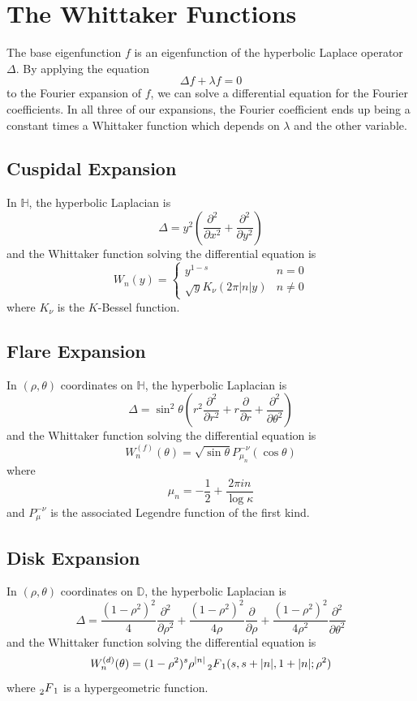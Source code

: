 \documentclass[]{article}
\begin{document}
\section*{The Whittaker Functions}

The base eigenfunction $f$ is an eigenfunction of the hyperbolic Laplace operator $\Delta$.
By applying the equation
$$
\Delta f + \lambda f = 0
$$
to the Fourier expansion of $f$, we can solve a differential equation for the Fourier coefficients.
In all three of our expansions, the Fourier coefficient ends up being a constant times a Whittaker function which depends on $\lambda$ and the other variable.

\subsection*{Cuspidal Expansion}

In $\mathbb{H}$, the hyperbolic Laplacian is
$$
\Delta = y^2\left( \frac{\partial^2}{\partial x^2} + \frac{\partial^2}{\partial y^2} \right)
$$
and the Whittaker function solving the differential equation is
$$
W_n(y) =
\begin{cases}
	y^{1 - s} & n = 0 \\
	\sqrt{y}K_\nu(2\pi|n|y) & n \neq 0
\end{cases}
$$
where $K_\nu$ is the $K$-Bessel function.

\subsection*{Flare Expansion}

In $(\rho, \theta)$ coordinates on $\mathbb{H}$, the hyperbolic Laplacian is
$$
\Delta = \sin^2\theta\left(r^2\frac{\partial^2}{\partial r^2} + r\frac{\partial}{\partial r} + \frac{\partial^2}{\partial\theta^2}\right)
$$
and the Whittaker function solving the differential equation is
$$
W_n^{(f)}(\theta) = \sqrt{\sin\theta}P^{-\nu}_{\mu_n}(\cos\theta)
$$
where
$$
\mu_n = -\frac{1}{2} + \frac{2\pi in}{\log \kappa}
$$
and $P_\mu^{-\nu}$ is the associated Legendre function of the first kind.

\subsection*{Disk Expansion}

In $(\rho, \theta)$ coordinates on $\mathbb{D}$, the hyperbolic Laplacian is
$$
\Delta = \frac{(1 - \rho^2)^2}{4}\frac{\partial^2}{\partial\rho^2} +
\frac{(1 - \rho^2)^2}{4\rho}\frac{\partial}{\partial\rho} +
\frac{(1 - \rho^2)^2}{4\rho^2}\frac{\partial^2}{\partial\theta^2}
$$
and the Whittaker function solving the differential equation is
$$
W_n^{(d)}(\theta) = (1 - \rho^2)^s\rho^{|n|} \prescript{}{2}{F}_1(s, s+|n|, 1+|n|; \rho^2)
$$
where $\prescript{}{2}{F}_1$ is a hypergeometric function.
\end{document}
